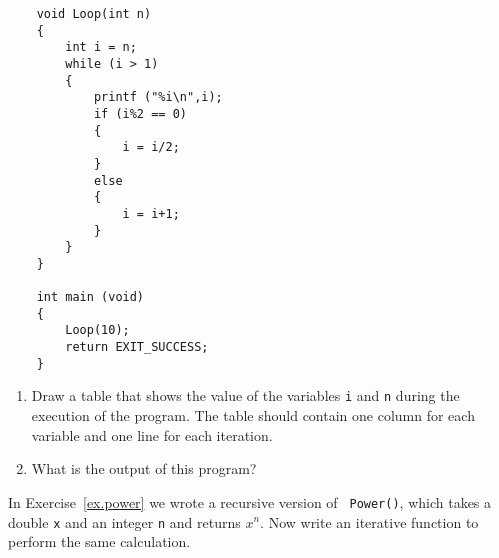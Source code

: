 

\begin{exercise}\label{infloop}
\begin{verbatim}
    void Loop(int n) 
    {
        int i = n;
        while (i > 1) 
        {
            printf ("%i\n",i);
            if (i%2 == 0) 
            {
                i = i/2;
            } 
            else 
            {
                i = i+1;
            }
        }
    }

    int main (void) 
    {
        Loop(10);
        return EXIT_SUCCESS;
    }
\end{verbatim}
%
\begin{enumerate}

\item  Draw a table that shows the value of the variables {\tt i} and {\tt n} during the execution of the program. 
The table should contain one column for each variable and one line for each iteration.


\item What is the output of this program?

\end{enumerate}
\end{exercise}




\begin{exercise}
In Exercise~\ref{ex.power} we wrote a recursive version of {\tt
Power()}, which takes a double {\tt x} and an integer {\tt n} and
returns $x^n$.  Now write an iterative function to perform the same
calculation.
\end{exercise}


